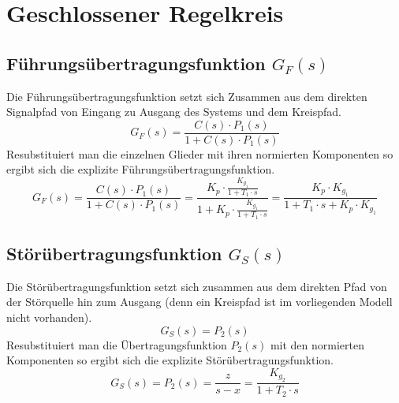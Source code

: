 \section{Geschlossener Regelkreis}

\subsection{Führungsübertragungsfunktion $G_F(s)$}
Die Führungsübertragungsfunktion setzt sich Zusammen aus dem
direkten Signalpfad von Eingang zu Ausgang des Systems und dem
Kreispfad.
\[
	G_F(s) = \frac{C(s) \cdot P_1(s)}{1 + C(s) \cdot P_1(s)}
\]
Resubstituiert man die einzelnen Glieder mit ihren normierten Komponenten
so ergibt sich die explizite Führungsübertragungsfunktion.
\[
	G_F(s)
	= \frac{C(s) \cdot P_1(s)}{1 + C(s) \cdot P_1(s)}
	= \frac{
		K_p \cdot \frac{K_{g_1}}{1+T_1\cdot s}
	}{
		1 + K_p \cdot \frac{K_{g_1}}{1+T_1\cdot s}	
	}
	= \frac{K_p \cdot K_{g_1}}{1 + T_1 \cdot s + K_p \cdot K_{g_1}}
\]

\subsection{Störübertragungsfunktion $G_S(s)$}
Die Störübertragungsfunktion setzt sich zusammen aus dem direkten Pfad
von der Störquelle hin zum Ausgang (denn ein Kreispfad ist im vorliegenden
Modell nicht vorhanden).
\[
	G_S(s) = P_2(s)
\]
Resubstituiert man die Übertragungsfunktion $P_2(s)$ mit den normierten
Komponenten so ergibt sich die explizite Störübertragungsfunktion.
\[
	G_S(s) = P_2(s) = \frac{z}{s-x} = \frac{K_{g_2}}{1 + T_2 \cdot s}
\]
